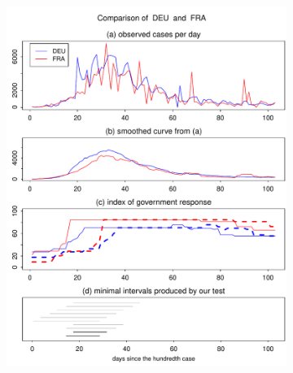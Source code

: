 \documentclass[a4paper,12pt]{article}
\numberwithin{equation}{section}
\begin{document}
\begin{figure}[t!]
\begin{subfigure}[b]{0.475\textwidth}
\includegraphics[width=\textwidth]{plots/DEU_vs_FRA}
\end{subfigure}
\vspace{0.25cm}
\begin{subfigure}[b]{0.475\textwidth}

\end{subfigure}
\end{figure}
\end{document}
